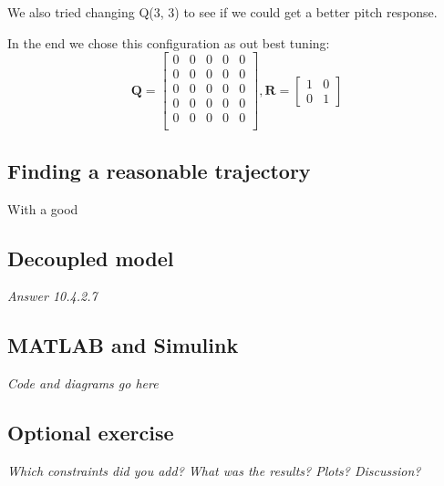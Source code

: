 \documentclass[../main.tex]{subfiles}
\begin{document}
We also tried changing Q(3, 3) to see if we could get a better pitch response.

In the end we chose this configuration as out best tuning: 
\begin{equation}\label{key}
	\bm Q = \begin{bmatrix}
		0 & 0 & 0 & 0 & 0 \\
		0 & 0 & 0 & 0 & 0 \\
		0 & 0 & 0 & 0 & 0 \\
		0 & 0 & 0 & 0 & 0 \\
		0 & 0 & 0 & 0 & 0 \\
	\end{bmatrix}, 
	\bm R = \begin{bmatrix}
		1 & 0 \\ 
		0 & 1
	\end{bmatrix}
\end{equation}

\subsection{Finding a reasonable trajectory}
With a good
 






\subsection{Decoupled model}
\textit{Answer 10.4.2.7}

\subsection{MATLAB and Simulink}
\textit{Code and diagrams go here}

\subsection{Optional exercise}
\textit{Which constraints did you add? What was the results? Plots? Discussion?}
\end{document}

